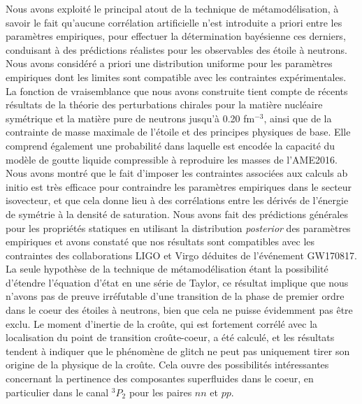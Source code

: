 Nous avons exploité le principal atout de la technique de métamodélisation, à 
savoir le fait qu'aucune corrélation artificielle n'est introduite a priori 
entre les paramètres empiriques, pour effectuer la détermination bayésienne ces
derniers, conduisant à des prédictions réalistes pour les observables des 
étoile à neutrons. Nous avons considéré a priori une distribution uniforme pour 
les paramètres empiriques dont les limites sont compatible avec les 
contraintes expérimentales. 
%
La fonction de vraisemblance que nous avons construite tient compte de 
récents résultats de la théorie des perturbations chirales pour la matière 
nucléaire symétrique et la matière pure de neutrons jusqu'à 0.20 fm$^{-3}$,
ainsi que de la contrainte de masse maximale de l'étoile et des principes
physiques de base. 
Elle comprend également une probabilité dans laquelle est encodée la capacité 
du modèle de goutte liquide compressible à reproduire les masses de l'AME2016. 
Nous avons montré que le fait d'imposer les contraintes 
associées aux calculs ab initio est très efficace pour contraindre les 
paramètres empiriques dans le secteur isovecteur, et que cela donne lieu à des 
corrélations entre les dérivés de l'énergie de symétrie à la densité de 
saturation.
Nous avons fait des prédictions générales pour les propriétés statiques en 
utilisant la distribution \textit{posterior} des paramètres empiriques et avons 
constaté que nos résultats sont compatibles avec les contraintes des 
collaborations LIGO et Virgo déduites de l'événement GW170817.
%
La seule hypothèse de la technique de métamodélisation étant la 
possibilité d'étendre l'équation d'état en une série de Taylor, ce résultat 
implique que nous n'avons pas de preuve irréfutable d'une transition de la 
phase de premier ordre dans le coeur des étoiles à neutrons, bien que cela
ne puisse évidemment pas être exclu.
%
Le moment d'inertie de la croûte, qui est fortement corrélé avec la 
localisation du point de transition croûte-coeur, a été calculé, et les
résultats tendent à indiquer que le phénomène de glitch ne peut pas uniquement
tirer son origine de la physique de la croûte. 
Cela ouvre des possibilités intéressantes concernant la pertinence des 
composantes superfluides dans le coeur, en particulier dans le canal $^3P_2$ 
pour les paires $nn$ et $pp$.

